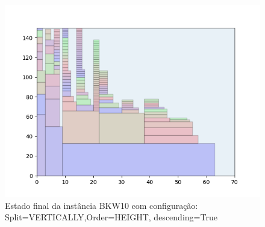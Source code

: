 \begin{figure}[H]
    \centering
    \caption[]{Estado final da instância BKW10 com configuração: Split=VERTICALLY,Order=HEIGHT, descending=True}
    \label{fig:bkw10-vertically-height-true}
    \includegraphics[scale=0.5]{output/figures/bkw/bkw10/vertically/height/true/000}
\end{figure}
